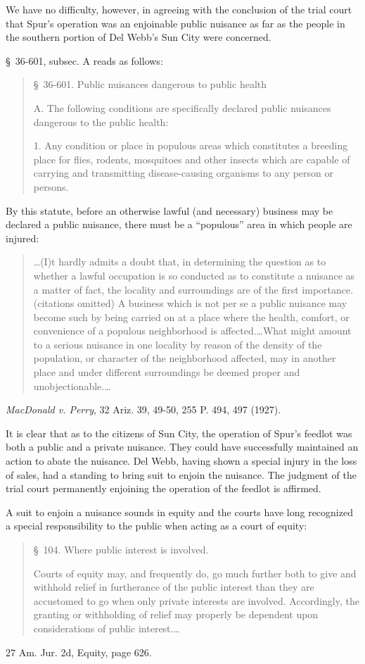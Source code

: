 We have no difficulty, however, in agreeing with the conclusion of the trial
court that Spur's operation was an enjoinable public nuisance as far as the
people in the southern portion of Del Webb's Sun City were concerned.

\S~36-601, subsec. A reads as follows:
\begin{quotation}
\noindent \S~36-601. Public nuisances dangerous to public health

A. The following conditions are specifically declared public nuisances
dangerous to the public health:

1. Any condition or place in populous areas which constitutes a breeding
place for flies, rodents, mosquitoes and other insects which are capable of
carrying and transmitting disease-causing organisms to any person or persons.
\end{quotation}
By this statute, before an otherwise lawful (and necessary) business may be
declared a public nuisance, there must be a ``populous'' area in which people
are injured:
\begin{quote}
\ldots (I)t hardly admits a doubt that, in determining the question as to
whether a lawful occupation is so conducted as to constitute a nuisance as a
matter of fact, the locality and surroundings are of the first importance.
(citations omitted) A business which is not per se a public nuisance may become
such by being carried on at a place where the health, comfort, or convenience of
a populous neighborhood is affected.\ldots What might amount to a serious
nuisance in one locality by reason of the density of the population, or
character of the neighborhood affected, may in another place and under different
surroundings be deemed proper and unobjectionable.\ldots
\end{quote}
\emph{MacDonald v. Perry}, 32 Ariz. 39, 49-50, 255 P. 494, 497 (1927).

It is clear that as to the citizens of Sun City, the operation of Spur's feedlot
was both a public and a private nuisance. They could have successfully
maintained an action to abate the nuisance. Del Webb, having shown a special
injury in the loss of sales, had a standing to bring suit to enjoin the
nuisance. The judgment of the trial court permanently enjoining the operation of
the feedlot is affirmed.


A suit to enjoin a nuisance sounds in equity and the courts have long recognized
a special responsibility to the public when acting as a court of equity:
\begin{quotation}
\noindent \S~104. Where public interest is involved.

Courts of equity may, and frequently do, go much further both to give and
withhold relief in furtherance of the public interest than they are accustomed
to go when only private interests are involved. Accordingly, the granting or
withholding of relief may properly be dependent upon considerations of public
interest.\ldots
\end{quotation}
27 Am. Jur. 2d, Equity, page 626.

